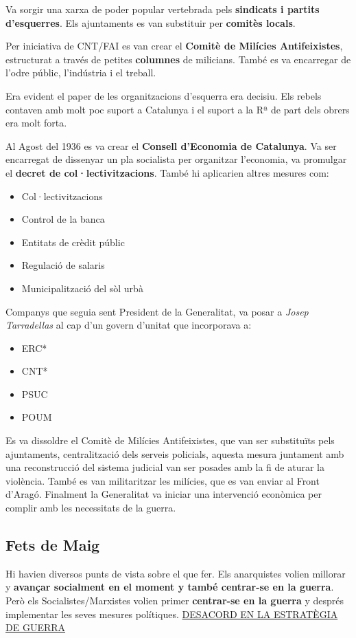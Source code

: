\documentclass[arial,a4paper,print]{article}
\begin{document}
Va sorgir una xarxa de poder popular vertebrada pels \textbf{sindicats i partits d'esquerres}. Els ajuntaments es van substituir per \textbf{comitès locals}. 

Per iniciativa de CNT/FAI es van crear el \textbf{Comitè de Milícies Antifeixistes}, estructurat a través de petites \textbf{columnes} de milicians. També es va encarregar de l'odre públic, l'indústria i el treball. 

Era evident el paper de les organitzacions d'esquerra era decisiu. Els rebels contaven amb molt poc suport a Catalunya i el suport a la Rª de part dels obrers era molt forta. 

Al Agost del 1936 es va crear el \textbf{Consell d'Economia de Catalunya}. Va ser encarregat de dissenyar un pla socialista per organitzar l'economia, va promulgar el \textbf{decret de col·lectivitzacions}. També hi aplicarien altres mesures com:
\begin{itemize}
	\item Col·lectivitzacions
	\item Control de la banca
	\item Entitats de crèdit públic
	\item Regulació de salaris
	\item Municipalització del sòl urbà
\end{itemize}

Companys que seguia sent President de la Generalitat, va posar a \textit{Josep Tarradellas} al cap d'un govern d'unitat que incorporava a:
\begin{itemize}
	\item ERC*
	\item CNT*
	\item PSUC
	\item POUM
\end{itemize}
Es va dissoldre el Comitè de Milícies Antifeixistes, que van ser substituïts pels ajuntaments, centralització dels serveis policials, aquesta mesura juntament amb una reconstrucció del sistema judicial van ser posades amb la fi de aturar la violència. També es van militaritzar les milícies, que es van enviar al Front d'Aragó. Finalment la Generalitat va iniciar una intervenció econòmica per complir amb les necessitats de la guerra.

\subsection{Fets de Maig}
Hi havien diversos punts de vista sobre el que fer. Els anarquistes volien millorar y \textbf{avançar socialment en el moment y també centrar-se en la guerra}. Però els Socialistes/Marxistes volien primer \textbf{centrar-se en la guerra} y després implementar les seves mesures polítiques. 
\underline{DESACORD EN LA ESTRATÈGIA DE GUERRA}
\end{document}
